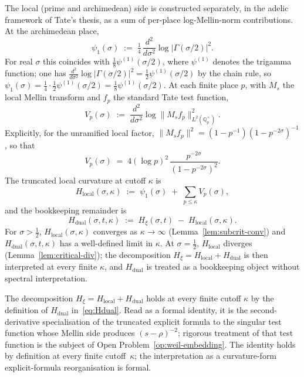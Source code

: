 \documentclass[11pt]{article}
\newcommand{\Hxi}{H_{\xi}}
\newcommand{\Hlocal}{H_{\mathrm{local}}}
\newcommand{\Hdual}{H_{\mathrm{dual}}}
\begin{document}
The local (prime and archimedean) side is constructed
separately, in the adelic framework of Tate's thesis, as a
sum of per-place log-Mellin-norm contributions.
At the archimedean place,
\begin{equation}\label{eq:psi1-def}
\psi_1(\sigma)
\;:=\;\tfrac{1}{4}\,\frac{d^2}{d\sigma^2}
\log\lvert\Gamma(\sigma/2)\rvert^2.
\end{equation}
For real $\sigma$ this coincides with
$\tfrac{1}{8}\psi^{(1)}(\sigma/2)$, where $\psi^{(1)}$
denotes the trigamma function; one has
$\frac{d^2}{d\sigma^2}\log\lvert\Gamma(\sigma/2)\rvert^2
=\tfrac{1}{2}\psi^{(1)}(\sigma/2)$ by the chain rule, so
$\psi_1(\sigma)=\tfrac{1}{4}\cdot\tfrac{1}{2}
\psi^{(1)}(\sigma/2)=\tfrac{1}{8}\psi^{(1)}(\sigma/2)$.
At each finite place $p$, with $M_s$ the local Mellin
transform and $f_p$ the standard Tate test function,
\begin{equation}\label{eq:Vp-def}
V_p(\sigma)\;:=\;\frac{d^2}{d\sigma^2}
\log\lVert M_s f_p\rVert^{2}_{L^{2}(\mathbb{Q}_p^{\times})}.
\end{equation}
Explicitly, for the unramified local factor,
$\lVert M_s f_p\rVert^{2}=(1-p^{-1})(1-p^{-2\sigma})^{-1}$,
so that
\begin{equation}\label{eq:Vp}
V_p(\sigma)
\;=\;4(\log p)^{2}\,
\frac{p^{-2\sigma}}{(1-p^{-2\sigma})^{2}}.
\end{equation}
The truncated local curvature at cutoff $\kappa$ is
\begin{equation}\label{eq:Hlocal}
\Hlocal(\sigma,\kappa)
\;:=\;\psi_1(\sigma)\;+\;\sum_{p\le\kappa}V_p(\sigma),
\end{equation}
and the bookkeeping remainder is
\begin{equation}\label{eq:Hdual}
\Hdual(\sigma,t,\kappa)
\;:=\;\Hxi(\sigma,t)\;-\;\Hlocal(\sigma,\kappa).
\end{equation}
For $\sigma>\tfrac12$, $\Hlocal(\sigma,\kappa)$ converges as
$\kappa\to\infty$ (Lemma~\ref{lem:subcrit-conv}) and
$\Hdual(\sigma,t,\kappa)$ has a well-defined limit in
$\kappa$.
At $\sigma=\tfrac12$, $\Hlocal$ diverges
(Lemma~\ref{lem:critical-div}); the decomposition
$\Hxi=\Hlocal+\Hdual$ is then interpreted at every finite
$\kappa$, and $\Hdual$ is treated as a bookkeeping object
without spectral interpretation.

The decomposition $\Hxi=\Hlocal+\Hdual$ holds at every finite
cutoff $\kappa$ by the definition of $\Hdual$
in~\eqref{eq:Hdual}.
Read as a formal identity, it is the second-derivative
specialisation of the truncated explicit formula to the
singular test function whose Mellin side produces
$(s-\rho)^{-2}$; rigorous treatment of that test function is
the subject of Open Problem~\ref{op:weil-embedding}.
The identity holds by definition at every finite
cutoff~$\kappa$; the interpretation as a curvature-form
explicit-formula reorganisation is formal.
\end{document}
